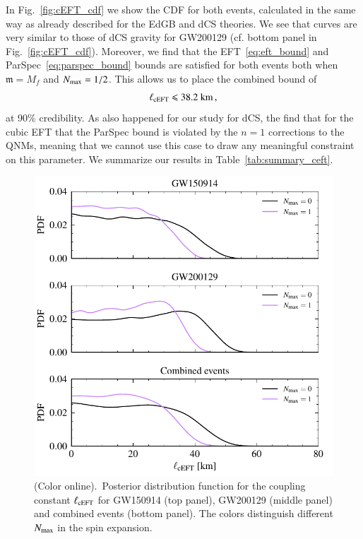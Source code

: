 \documentclass[twocolumn,
               prd,
               aps,
               superscriptaddress,
               tightenlines,
               nofootinbib,
               eqsecnum,
               amsfonts,
               amsmath,
               longbibliography]{revtex4-1}
\begin{document}
In Fig.~\ref{fig:cEFT_cdf} we show the CDF for both events, calculated in the
same way as already described for the EdGB and dCS theories.
%
We see that curves are very similar to those of dCS gravity for GW200129 (cf.
bottom panel in Fig.~\ref{fig:cEFT_cdf}).
%
Moreover, we find that the EFT~\eqref{eq:eft_bound} and
ParSpec~\eqref{eq:parspec_bound} bounds are satisfied for both events both when
$\mathfrak{m} = M_f$ and $N_{\rm max} = 1/2$.
%
This allows us to place the combined bound of
%
\begin{equation}
    \ell_{\rm cEFT} \leqslant 38.2~\textrm{km}\,,
\end{equation}
%
at 90\% credibility. As also happened for our study for dCS, the find that for
the cubic EFT that the ParSpec bound is violated by the $n = 1$ corrections to
the QNMs, meaning that we cannot use this case to draw any meaningful
constraint on this parameter.
%
We summarize our results in Table~\ref{tab:summary_ceft}.

\begin{figure}[t]
\includegraphics[width=\columnwidth]{figs/ceft_posteriors_combined.pdf}
\caption{(Color online).~Posterior distribution function for the coupling constant $\ell_{\rm cEFT}$ for
GW150914 (top panel), GW200129 (middle panel) and combined events (bottom panel).
%
The colors distinguish different $N_{\rm max}$ in the spin expansion.
}
\label{fig:cEFT_exec_sum}
\end{figure}
\end{document}
